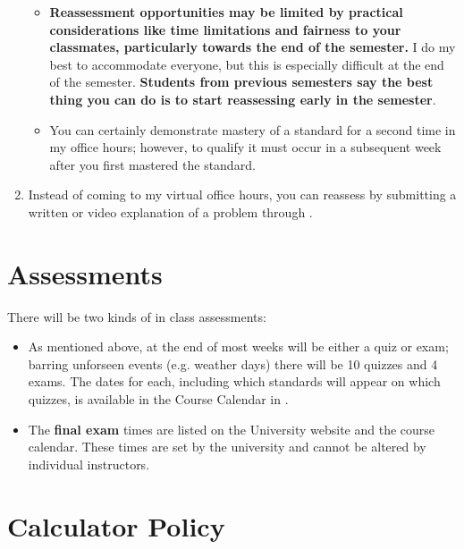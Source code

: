 \documentclass{article}
\begin{document}
\begin{enumerate}[1)]
\begin{itemize}
    \item \textbf{Reassessment opportunities may be limited by practical considerations like time limitations and fairness to your classmates, particularly towards the end of the semester.}  I do my best to accommodate everyone, but this is especially difficult at the end of the semester.  {\bf Students from previous semesters say the best thing you can do is to start reassessing early in the semester}.
    \item You can certainly demonstrate mastery of a standard for a second time in my office hours; however, to qualify it must occur in a subsequent week after you first mastered the standard.
    \end{itemize}
	\item Instead of coming to my virtual office hours, you can reassess by submitting a written or video explanation of a problem through \LMS.
    \end{enumerate}




\section*{\fontsize{12}{15}\selectfont Assessments}
There will be two kinds of in class assessments:
\begin{itemize}
\item As mentioned above, at the end of most weeks will be either a quiz or exam; barring unforseen events (e.g. weather days) there will be 10 quizzes and 4 exams.   The dates for each, including which standards will appear on which quizzes, is available in the Course Calendar in \LMS.
\item The {\bf final exam} times are listed on the University website and the course calendar. These times are set by the university and cannot be altered by individual instructors.
\end{itemize}

\section*{\fontsize{12}{15}\selectfont Calculator Policy}
\end{document}
